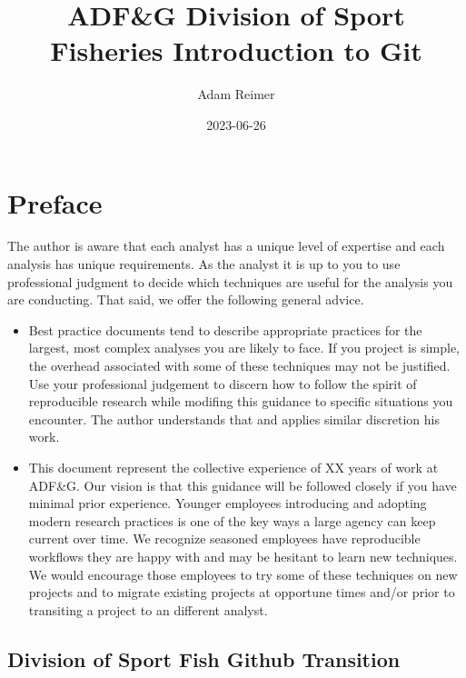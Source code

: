 \documentclass[
  letterpaper,
  DIV=11,
  numbers=noendperiod]{scrreprt}
\title{ADF\&G Division of Sport Fisheries Introduction to Git}
\author{Adam Reimer}
\date{2023-06-26}
\renewcommand*\contentsname{Table of contents}
\newcommand\contentsname{Table of contents}
\begin{document}
\maketitle
\renewcommand*\contentsname{Table of contents}
{
\hypersetup{linkcolor=}
\setcounter{tocdepth}{2}
\tableofcontents
}

\hypertarget{preface}{%
\chapter*{Preface}\label{preface}}


The author is aware that each analyst has a unique level of expertise
and each analysis has unique requirements. As the analyst it is up to
you to use professional judgment to decide which techniques are useful
for the analysis you are conducting. That said, we offer the following
general advice.

\begin{itemize}
\item
  Best practice documents tend to describe appropriate practices for the
  largest, most complex analyses you are likely to face. If you project
  is simple, the overhead associated with some of these techniques may
  not be justified. Use your professional judgement to discern how to
  follow the spirit of reproducible research while modifing this
  guidance to specific situations you encounter. The author understands
  that and applies similar discretion his work.
\item
  This document represent the collective experience of XX years of work
  at ADF\&G. Our vision is that this guidance will be followed closely
  if you have minimal prior experience. Younger employees introducing
  and adopting modern research practices is one of the key ways a large
  agency can keep current over time. We recognize seasoned employees
  have reproducible workflows they are happy with and may be hesitant to
  learn new techniques. We would encourage those employees to try some
  of these techniques on new projects and to migrate existing projects
  at opportune times and/or prior to transiting a project to an
  different analyst.
\end{itemize}

\hypertarget{division-of-sport-fish-github-transition}{%
\section*{Division of Sport Fish Github
Transition}\label{division-of-sport-fish-github-transition}}
\end{document}
